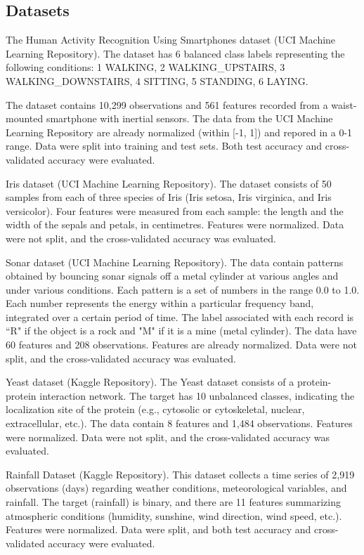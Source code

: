 \documentclass[11pt,a4paper]{article}
\begin{document}
\subsection*{Datasets}
The Human Activity Recognition Using Smartphones dataset (UCI Machine Learning Repository). The dataset has 6 balanced class labels representing the following conditions: 1 WALKING, 2 WALKING\_UPSTAIRS, 3 WALKING\_DOWNSTAIRS, 4 SITTING, 5 STANDING, 6 LAYING.

The dataset contains 10,299 observations and 561 features recorded from a waist-mounted smartphone with inertial sensors. The data from the UCI Machine Learning Repository are already normalized (within [-1, 1]) and repored in a 0-1 range. Data were split into training and test sets. Both test accuracy and cross-validated accuracy were evaluated.

Iris dataset (UCI Machine Learning Repository). The dataset consists of 50 samples from each of three species of Iris (Iris setosa, Iris virginica, and Iris versicolor). Four features were measured from each sample: the length and the width of the sepals and petals, in centimetres. Features were normalized. Data were not split, and the cross-validated accuracy was evaluated.

Sonar dataset (UCI Machine Learning Repository). The data contain patterns obtained by bouncing sonar signals off a metal cylinder at various angles and under various conditions. Each pattern is a set of numbers in the range 0.0 to 1.0. Each number represents the energy within a particular frequency band, integrated over a certain period of time. The label associated with each record is “R" if the object is a rock and "M" if it is a mine (metal cylinder). The data have 60 features and 208 observations. Features are already normalized. Data were not split, and the cross-validated accuracy was evaluated.

Yeast dataset (Kaggle Repository). The Yeast dataset consists of a protein-protein interaction network. The target has 10 unbalanced classes, indicating the localization site of the protein (e.g., cytosolic or cytoskeletal, nuclear, extracellular, etc.). The data contain 8 features and 1,484 observations. Features were normalized. Data were not split, and the cross-validated accuracy was evaluated.

Rainfall Dataset (Kaggle Repository). This dataset collects a time series of 2,919 observations (days) regarding weather conditions, meteorological variables, and rainfall. The target (rainfall) is binary, and there are 11 features summarizing atmospheric conditions (humidity, sunshine, wind direction, wind speed, etc.). Features were normalized. Data were split, and both test accuracy and cross-validated accuracy were evaluated.
\end{document}
